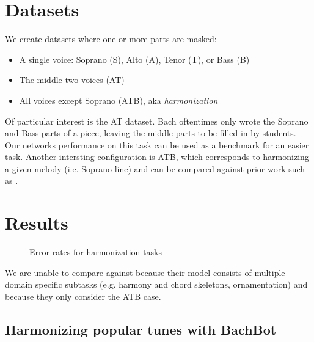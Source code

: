 \section{Datasets}

We create datasets where one or more parts are masked:
\begin{itemize}
  \item A single voice: Soprano (S), Alto (A), Tenor (T), or Bass (B)
  \item The middle two voices (AT)
  \item All voices except Soprano (ATB), aka \emph{harmonization}
\end{itemize}


Of particular interest is the AT dataset. Bach oftentimes only wrote the
Soprano and Bass parts of a piece, leaving the middle parts to be filled in by
students. Our networks performance on this task can be used as a benchmark for
an easier task. Another intersting configuration is ATB, which corresponds to
harmonizing a given melody (i.e. Soprano line) and can be compared against
prior work such as \citet{Allan2005}.

\section{Results}
\label{sec:harmonization-results}


\begin{figure}[tb]
  \centering
  
  \caption{Error rates for harmonization tasks}
  \label{fig:harmonization-results}
\end{figure}

We are unable to compare against \citet{Allan2005} because their model consists
of multiple domain specific subtasks (e.g. harmony and chord skeletons,
ornamentation) and because they only consider the ATB case.

\subsection{Harmonizing popular tunes with BachBot}

